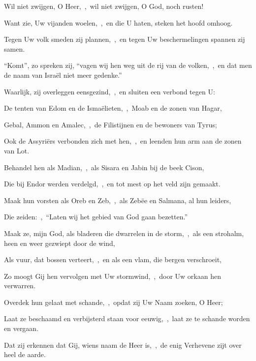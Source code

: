 \documentclass[12pt,twoside,a5paper]{article}
\begin{document}
\begin{halfparskip}

  Wil niet zwijgen, O Heer,~\sep\ wil niet zwijgen, O God, noch rusten!


  Want zie, Uw vijanden woelen,~\sep\ en die U haten, steken het hoofd omhoog.

  Tegen Uw volk smeden zij plannen,~\sep\ en tegen Uw beschermelingen spannen zij samen.

  ``Komt'', zo spreken zij, ``vagen wij hen weg uit de rij van de volken,~\sep\ en dat men de naam van Israël niet meer gedenke.''

  Waarlijk, zij overleggen eensgezind,~\sep\ en sluiten een verbond tegen U:

  De tenten van Edom en de Ismaëlieten,~\sep\ Moab en de zonen van Hagar,

  Gebal, Ammon en Amalec,~\sep\ de Filistijnen en de bewoners van Tyrus;

  Ook de Assyriërs verbonden zich met hen,~\sep\ en leenden hun arm aan de zonen van Lot.
\end{halfparskip}

\begin{halfparskip}

  Behandel hen als Madian,~\sep\ als Sisara en Jabin bij de beek Cison,

  Die bij Endor werden verdelgd,~\sep\ en tot mest op het veld zijn gemaakt.

  Maak hun vorsten als Oreb en Zeb,~\sep\ als Zebëe en Salmana, al hun leiders,

  Die zeiden:~\sep\ ``Laten wij het gebied van God gaan bezetten.''

  Maak ze, mijn God, als bladeren die dwarrelen in de storm,~\sep\ als een strohalm, heen en weer gezwiept door de wind,

  Als vuur, dat bossen verteert,~\sep\ en als een vlam, die bergen verschroeit,

  Zo moogt Gij hen vervolgen met Uw stormwind,~\sep\ door Uw orkaan hen verwarren.

  Overdek hun gelaat met schande,~\sep\ opdat zij Uw Naam zoeken, O Heer;

  Laat ze beschaamd en verbijsterd staan voor eeuwig,~\sep\ laat ze te schande worden en vergaan.

  Dat zij erkennen dat Gij, wiens naam de Heer is,~\sep\ de enig Verhevene zijt over heel de aarde.
\end{halfparskip}
\end{document}
